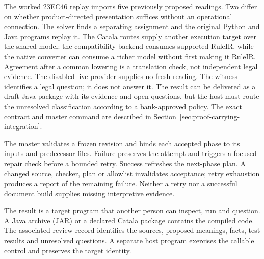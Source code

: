 \documentclass[12pt,a4paper,oneside,openany]{book}
\begin{document}
The worked 23EC46 replay imports five previously proposed readings. Two differ
on whether product-directed presentation suffices without an operational
connection. The solver finds a separating assignment and the original Python
and Java programs replay it. The Catala routes supply another execution target
over the shared model: the compatibility backend consumes supported RuleIR,
while the native converter can consume a richer model without first making it
RuleIR. Agreement after a common lowering is a translation check, not
independent legal evidence. The disabled live provider supplies no fresh
reading. The witness identifies a legal question; it does not answer it.
The result can be delivered
as a draft Java package with its evidence and open questions, but the host must
route the unresolved classification according to a bank-approved policy.
The exact contract and master command are described in
Section~\ref{sec:proof-carrying-integration}.

The master validates a frozen revision and binds each accepted phase to its
inputs and predecessor files.
Failure preserves the attempt and triggers a focused repair check before a
bounded retry. Success refreshes the next-phase plan. A changed source, checker,
plan or allowlist invalidates acceptance; retry exhaustion produces a report of
the remaining failure. Neither a retry nor a successful document build supplies
missing interpretive evidence.

\clearpage
{}
The result is a target program that another person can inspect, run and
question. A Java archive (JAR) or a declared Catala package contains the
compiled code. The associated review record identifies the sources, proposed
meanings, facts, test results and unresolved questions. A separate host program
exercises the callable control and preserves the target identity.

\begin{MapDiagram}
\end{MapDiagram}
\end{document}
